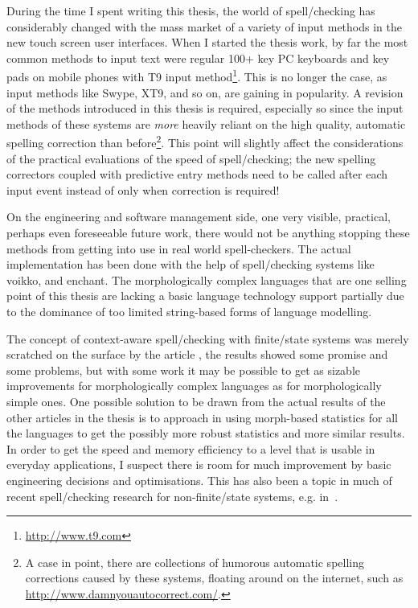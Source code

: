 \documentclass[officiallayout]{unihelcompling}
\begin{document}
During the time I spent writing this thesis, the world of spell\-/checking has
considerably changed with the mass market of a variety of input methods in the
new touch screen user interfaces. When I started the thesis work, by far the
most common methods to input text were regular 100+ key PC keyboards and key
pads on mobile phones with T9 input method\footnote{\url{http://www.t9.com}}.
This is no longer the case, as input methods like Swype, XT9, and so on, are
gaining in popularity. A revision of the methods introduced in this thesis is
required, especially so since the input methods of these systems are
\emph{more} heavily reliant on the high quality, automatic spelling correction
than before\footnote{A case in point, there are collections of humorous
automatic spelling corrections caused by these systems, floating around on the
internet, such as \url{http://www.damnyouautocorrect.com/}.}.  This point will
slightly affect the considerations of the practical evaluations of the speed of
spell\-/checking; the new spelling correctors coupled with predictive entry
methods need to be called after each input event instead of only when
correction is required!

On the engineering and software management side, one very visible, practical,
perhaps even foreseeable future work, there would not be anything stopping
these methods from getting into use in real world spell-checkers. The actual
implementation has been done with the help of spell\-/checking systems like
voikko, and enchant. The morphologically complex languages that are one selling
point of this thesis are lacking a basic language technology support partially
due to the dominance of too limited string-based forms of language modelling.

The concept of context-aware spell\-/checking with finite\-/state systems was
merely scratched on the surface by the article
, the results showed some promise and some
problems, but with some work it may be possible to get as sizable improvements
for morphologically complex languages as for morphologically simple ones. One
possible solution to be drawn from the actual results of the other articles in
the thesis is to approach in using morph-based statistics for all the languages
to get the possibly more robust statistics and more similar results. In order
to get the speed and memory efficiency to a level that is usable in everyday
applications, I suspect there is room for much improvement by basic engineering
decisions and optimisations. This has also been a topic in much of recent
spell\-/checking research for non-finite\-/state systems, e.g.
in~\citep{carlson2001scaling}.
\end{document}
